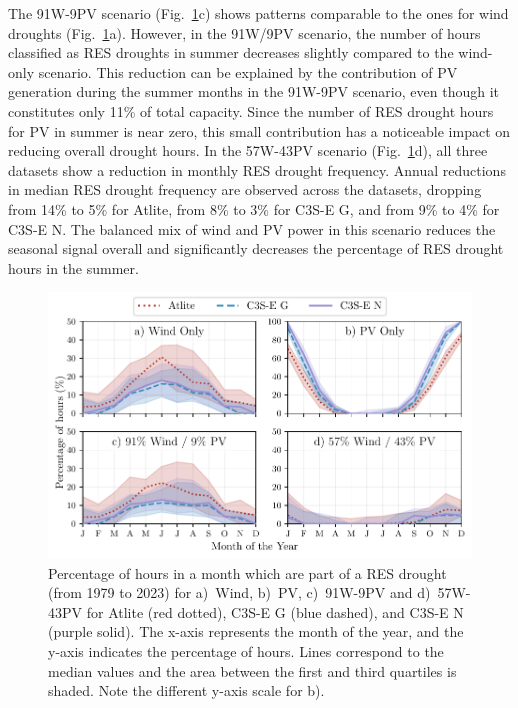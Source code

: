 \documentclass[preprint, 12pt]{elsarticle}
\begin{document}
The 91W-9PV scenario (Fig.~\ref{fig:res_droughts_seasonality}c) shows patterns comparable to the ones for wind droughts (Fig.~\ref{fig:res_droughts_seasonality}a). However, in the 91W/9PV scenario, the number of hours classified as RES droughts in summer decreases slightly compared to the wind-only scenario. This reduction can be explained by the contribution of PV generation during the summer months in the 91W-9PV scenario, even though it constitutes only 11\% of total capacity. Since the number of RES drought hours for PV in summer is near zero, this small contribution has a noticeable impact on reducing overall drought hours. In the 57W-43PV scenario (Fig.~\ref{fig:res_droughts_seasonality}d), all three datasets show a reduction in monthly RES drought frequency. Annual reductions in median RES drought frequency are observed across the datasets, dropping from 14\% to 5\% for Atlite, from 8\% to 3\% for C3S-E G, and from 9\% to 4\% for C3S-E N. The balanced mix of wind and PV power in this scenario reduces the seasonal signal overall and significantly decreases the percentage of RES drought hours in the summer.

\begin{figure}[!ht]
	\centering
	\includegraphics[width=\textwidth]{droughts_seasonality.pdf}
	\caption{Percentage of hours in a month which are part of a RES drought (from 1979 to 2023) for a)~Wind, b)~PV, c)~91W-9PV and d)~57W-43PV for Atlite (red dotted), C3S-E G (blue dashed), and C3S-E N (purple solid). The x-axis represents the month of the year, and the y-axis indicates the percentage of hours. Lines correspond to the median values and the area between the first and third quartiles is shaded. Note the different y-axis scale for b).}
	\label{fig:res_droughts_seasonality}
\end{figure}
\end{document}
